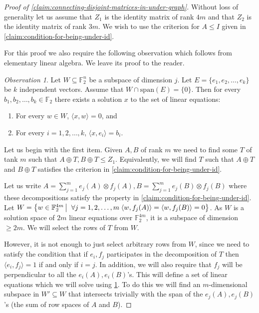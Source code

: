 \documentclass[10pt,a4paper]{article}
\newcommand{\prettyref}[1]{\cref{#1}}
\theoremstyle{definition}
\theoremstyle{remark}
\newtheorem{observation}[theorem]{Observation}
\newcommand\sett[2]{\left\{ #1 \left| \; \vphantom{#1 #2} \right. #2  \right\}}
\newcommand{\set}[1]{\{#1\}}
\newcommand{\iprod}[1]{\langle#1\rangle}
\def\sp{\mathrm{ span}}
\newcommand{\F}{\mathbb{F}}
\renewcommand{\leq}{\leqslant}
\renewcommand{\geq}{\geqslant}
\numberwithin{equation}{section}
\let\pref=\prettyref
\begin{document}
\begin{proof}[Proof of \pref{claim:connecting-disjoint-matrices-in-under-graph}]
    Without loss of generality let us assume that \(Z_1\) is the identity matrix of rank \(4m\) and that \(Z_2\) is the identity matrix of rank \(3m\). We wish to use the criterion for \(A \leq I\) given in \pref{claim:condition-for-being-under-id}.

    For this proof we also require the following observation which follows from elementary linear algebra. We leave its proof to the reader.
    \begin{observation}\label{obs:solution-to-non-homogenuous-linear-equations}
        Let \(W \subseteq \F_2^n\) be a subspace of dimension \(j\). Let \(E = \set{e_1,e_2,\dots,e_k}\) be \(k\) independent vectors. Assume that \(W \cap \sp(E) = \set{0}\). Then for every \(b_1,b_2,\dots,b_k \in \F_2\) there exists a solution \(x\) to the set of linear equations:
        \begin{enumerate}
            \item For every \(w \in W\), \(\iprod{x, w} = 0\), and
            \item For every \(i=1,2,\dots,k\), \(\iprod{x,e_i} = b_i\).
        \end{enumerate}
    \end{observation}

    Let us begin with the first item. Given \(A,B\) of rank \(m\) we need to find some \(T\) of tank \(m\) such that \(A \oplus T, B \oplus T \leq Z_1\). Equivalently, we will find \(T\) such that \(A \oplus T\) and \(B \oplus T\) satisfies the criterion in \pref{claim:condition-for-being-under-id}.
    
    Let us write \(A = \sum_{j=1}^{m} e_j(A) \otimes f_j(A), B=\sum_{j=1}^{m}e_j(B) \otimes f_j(B)\) where these decompositions satisfy the property in \pref{claim:condition-for-being-under-id}. Let \(W = \sett{w \in \F_2^{4m}}{\forall j=1,2,\dots,m \; \iprod{w,f_j(A)}=\iprod{w,f_j(B)}=0}\). As \(W\) is a solution space of \(2m\) linear equations over \(\F_2^{4m}\), it is a subspace of dimension \(\geq 2m\). We will select the rows of \(T\) from \(W\). 
    
    However, it is not enough to just select arbitrary rows from \(W\), since we need to satisfy the condition that if \(e_i, f_j\) participates in the decomposition of \(T\) then \(\iprod{e_i,f_j}=1\) if and only if \(i=j\). In addition, we will also require that \(f_j\) will be perpendicular to all the \(e_i(A),e_i(B)\)'s. This will define a set of linear equations which we will solve using \pref{obs:solution-to-non-homogenuous-linear-equations}. To do this we will find an \(m\)-dimensional subspace in \(W' \subseteq W\) that intersects trivially with the span of the \(e_j(A),e_j(B)\)'s (the sum of row spaces of \(A\) and \(B\)).


\end{proof}
\end{document}
